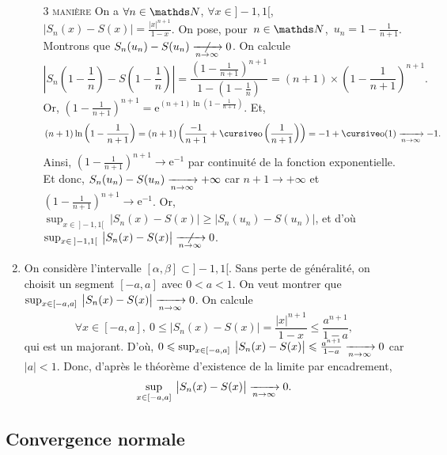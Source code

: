\begin{exo}
\begin{enumerate}
\begin{itemize}
				\item[\textsc{3\tsup{ème} manière}] On a $\forall n \in \N$, $\forall x \in {]-1,1[}$, $\big|S_n(x) - S(x)\big| = \frac{|x|^{n+1}}{1-x}$. On pose, pour~$n \in \N$,~$u_n = 1 - \frac{1}{n + 1}$. Montrons que $S_n(u_n) - S(u_n)\centernot{\tendsto{n\to \infty}} 0$. On calcule \[
						\left|S_n\left( 1 - \frac{1}{n} \right)  - S\left( 1 - \frac{1}{n} \right)\right| = \frac{\left( 1-\frac{1}{n+1} \right)^{n+1}}{1 - \left( 1 - \frac{1}{n} \right)} = (n+1) \times \left( 1 - \frac{1}{n+1} \right)^{n+1}
					.\]
					Or, $\left( 1 - \frac{1}{n+1} \right)^{n+1} = \mathrm{e}^{(n+1) \ln \left( 1 - \frac{1}{n+1} \right)}$. Et, \[(n+1)\ln\left( 1 - \frac{1}{n+1} \right) = (n+1)\left( \frac{-1}{n+1} + \po\left( \frac{1}{n+1} \right) \right) = -1 + \po(1) \tendsto{n\to \infty} -1.\]
					Ainsi, $\left( 1-\frac{1}{n+1} \right)^{n+1} \longrightarrow \mathrm{e}^{-1}$\/ par continuité de la fonction exponentielle. Et donc, $S_n(u_n) - S(u_n) \xrightarrow[n\to \infty]{} +\infty$\/ car $n+1 \longrightarrow +\infty$\/ et $\left( 1 - \frac{1}{n+1} \right)^{n+1} \longrightarrow \mathrm{e}^{-1}$. Or, $\sup_{x \in \:{]-1,1[}}\:\big|S_n(x) - S(x)\big| \ge \big|S_n(u_n) - S(u_n)\big|$, et d'où $\sup_{x \in \:{]-1,1[}}\:\big|S_n(x) - S(x)\big| \centernot{\tendsto{n\to \infty}} 0$.
			\end{itemize}
		\item On considère l'intervalle $[\alpha,\beta] \subset {]-1,1[}$. Sans perte de généralité, on choisit un segment $[-a,a]$\/ avec $0 < a < 1$. On veut montrer que $\sup_{x\in [-a,a]}\:\big|S_n(x) - S(x)\big|\xrightarrow[n\to \infty]{} 0$. On calcule \[
			\forall x \in [-a,a],\:0\le \big|S_n(x) - S(x)\big| = \frac{|x|^{n+1}}{1-x}\le \frac{a^{n+1}}{1-a},
		\] qui est un majorant. D'où, $0 \leqslant \sup_{x \in [-a,a]}\:\big|S_n(x) - S(x)\big| \leqslant \frac{a^{n+1}}{1-a} \xrightarrow[n\to \infty]{} 0$\/ car $|a| < 1$. Donc, d'après le théorème d'existence de la limite par encadrement, \[
			\sup_{x \in [-a,a]}\:\big|S_n(x) - S(x)\big| \xrightarrow[n\to \infty]{} 0
		.\]
	\end{enumerate}
\end{exo}

\subsection{Convergence normale}



